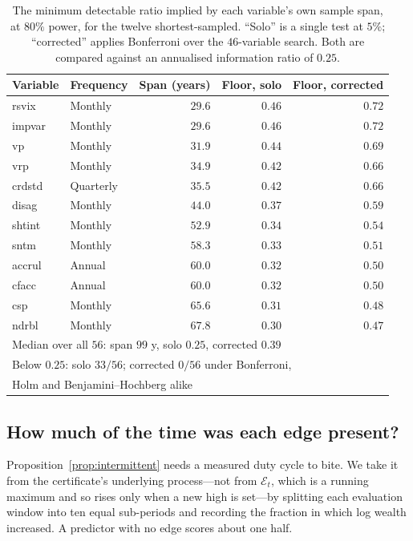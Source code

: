 \documentclass{article}
\theoremstyle{plain}
\theoremstyle{definition}
\begin{document}
\begin{table}[t]
  \centering
  \caption{The minimum detectable ratio implied by each variable's own sample span, at $80\%$
  power, for the twelve
  shortest-sampled. ``Solo'' is a single test at $5\%$; ``corrected'' applies Bonferroni over
  the $46$-variable search. Both are compared against an annualised information ratio of
  $0.25$.}
  \label{tab:audit}
  \small
  \begin{tabular}{llrrr}
    \toprule
    Variable & Frequency & Span (years) & Floor, solo & Floor, corrected \\
    \midrule
    rsvix  & Monthly   & $29.6$ & $0.46$ & $0.72$ \\
    impvar & Monthly   & $29.6$ & $0.46$ & $0.72$ \\
    vp     & Monthly   & $31.9$ & $0.44$ & $0.69$ \\
    vrp    & Monthly   & $34.9$ & $0.42$ & $0.66$ \\
    crdstd & Quarterly & $35.5$ & $0.42$ & $0.66$ \\
    disag  & Monthly   & $44.0$ & $0.37$ & $0.59$ \\
    shtint & Monthly   & $52.9$ & $0.34$ & $0.54$ \\
    sntm   & Monthly   & $58.3$ & $0.33$ & $0.51$ \\
    accrul & Annual    & $60.0$ & $0.32$ & $0.50$ \\
    cfacc  & Annual    & $60.0$ & $0.32$ & $0.50$ \\
    csp    & Monthly   & $65.6$ & $0.31$ & $0.48$ \\
    ndrbl  & Monthly   & $67.8$ & $0.30$ & $0.47$ \\
    \midrule
    \multicolumn{5}{l}{Median over all $56$: span $99$ y, solo $0.25$, corrected $0.39$} \\
    \multicolumn{5}{l}{Below $0.25$: solo $33/56$; corrected $0/56$ under Bonferroni,} \\
    \multicolumn{5}{l}{\quad Holm and Benjamini--Hochberg alike} \\
    \bottomrule
  \end{tabular}
\end{table}

\subsection{How much of the time was each edge present?}
\label{sec:duty}

Proposition~\ref{prop:intermittent} needs a measured duty cycle to bite. We take it from the
certificate's underlying process---not from $\mathcal{E}_t$, which is a running maximum and so
rises only when a new high is set---by splitting each evaluation window into ten equal
sub-periods and recording the fraction in which log wealth increased. A predictor with no edge
scores about one half.
\end{document}
